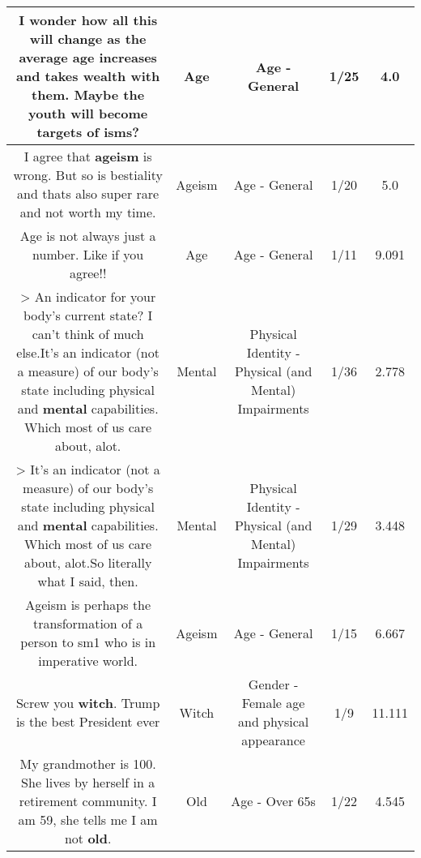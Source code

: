 \documentclass[11pt]{article}
\newlength\mylength
\begin{document}
\begin{center}
\begin{longtable}{|C{.65\mylength}|C{.30\mylength}|C{.12\mylength}|C{.12\mylength}|C{.12\mylength}|}
  \small I wonder how all this will change as the average \textbf{age} increases and takes wealth with them.  Maybe the youth will become targets of isms?\normalsize   & Age & Age - General & 1/25 & 4.0 \\  \hline
  \small I agree that \textbf{ageism} is wrong. But so is bestiality and thats also super rare and not worth my time.\normalsize   & Ageism & Age - General & 1/20 & 5.0 \\  \hline
  \small Age is not always just a number. Like if you agree!!\normalsize   & Age & Age - General & 1/11 & 9.091 \\  \hline
  \small > An indicator for your body's current state? I can't think of much else.It's an indicator (not a measure) of our body's state including physical and \textbf{mental} capabilities. Which most of us care about, alot.\normalsize   & Mental & Physical Identity - Physical (and Mental) Impairments & 1/36 & 2.778 \\  \hline
  \small > It's an indicator (not a measure) of our body's state including physical and \textbf{mental} capabilities. Which most of us care about, alot.So literally what I said, then.\normalsize   & Mental & Physical Identity - Physical (and Mental) Impairments & 1/29 & 3.448 \\  \hline
  \small Ageism is perhaps the transformation of a person to sm1 who is in imperative world.\normalsize   & Ageism & Age - General & 1/15 & 6.667 \\  \hline
  \small Screw you \textbf{witch}. Trump is the best President ever\normalsize   & Witch & Gender - Female age and physical appearance & 1/9 & 11.111 \\  \hline
  \small My grandmother is 100. She lives by herself in a retirement community.  I am 59, she tells me I am not \textbf{old}.\normalsize   & Old & Age - Over 65s & 1/22 & 4.545 \\  \hline
  
\end{longtable}
\end{center}
\end{document}
